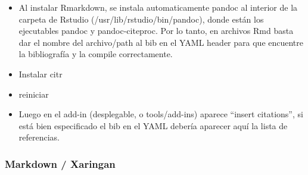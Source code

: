 \documentclass[
  11pt,
]{book}
\providecommand{\tightlist}{%
  \setlength{\itemsep}{0pt}\setlength{\parskip}{0pt}}
\begin{document}
\begin{itemize}
\begin{itemize}
    \begin{itemize}
    \tightlist
    \item
      Al instalar Rmarkdown, se instala automaticamente pandoc al interior de la carpeta de Rstudio (/usr/lib/rstudio/bin/pandoc), donde están los ejecutables pandoc y pandoc-citeproc. Por lo tanto, en archivos Rmd basta dar el nombre del archivo/path al bib en el YAML header para que encuentre la bibliografía y la compile correctamente.
    \item
      Instalar citr
    \item
      reiniciar
    \item
      Luego en el add-in (desplegable, o tools/add-ins) aparece ``insert citations'', si está bien especificado el bib en el YAML debería aparecer aquí la lista de referencias.
    \end{itemize}
  \end{itemize}
\end{itemize}

\hypertarget{markdown-xaringan}{%
\subsubsection{Markdown / Xaringan}\label{markdown-xaringan}}
\end{document}

